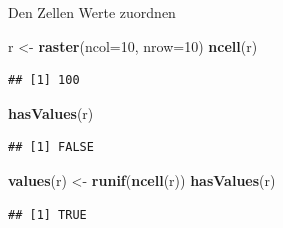 \documentclass[ignorenonframetext,]{beamer}
\newenvironment{Shaded}{\begin{snugshade}}{\end{snugshade}}
\newcommand{\DataTypeTok}[1]{\textcolor[rgb]{0.13,0.29,0.53}{#1}}
\newcommand{\DecValTok}[1]{\textcolor[rgb]{0.00,0.00,0.81}{#1}}
\newcommand{\KeywordTok}[1]{\textcolor[rgb]{0.13,0.29,0.53}{\textbf{#1}}}
\newcommand{\NormalTok}[1]{#1}
\newcommand{\StringTok}[1]{\textcolor[rgb]{0.31,0.60,0.02}{#1}}
\begin{document}
\begin{frame}[fragile]{Den Zellen Werte zuordnen}
\protect\hypertarget{den-zellen-werte-zuordnen}{}

\begin{Shaded}
\begin{Highlighting}[]
\NormalTok{r <-}\StringTok{ }\KeywordTok{raster}\NormalTok{(}\DataTypeTok{ncol=}\DecValTok{10}\NormalTok{, }\DataTypeTok{nrow=}\DecValTok{10}\NormalTok{)}
\KeywordTok{ncell}\NormalTok{(r)}
\end{Highlighting}
\end{Shaded}

\begin{verbatim}
## [1] 100
\end{verbatim}

\begin{Shaded}
\begin{Highlighting}[]
\KeywordTok{hasValues}\NormalTok{(r)}
\end{Highlighting}
\end{Shaded}

\begin{verbatim}
## [1] FALSE
\end{verbatim}

\begin{Shaded}
\begin{Highlighting}[]
\KeywordTok{values}\NormalTok{(r) <-}\StringTok{ }\KeywordTok{runif}\NormalTok{(}\KeywordTok{ncell}\NormalTok{(r))}
\KeywordTok{hasValues}\NormalTok{(r)}
\end{Highlighting}
\end{Shaded}

\begin{verbatim}
## [1] TRUE
\end{verbatim}

\end{frame}
\end{document}
